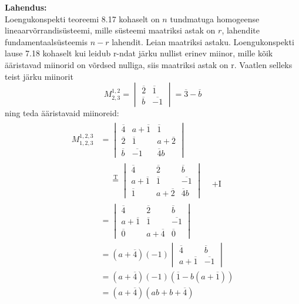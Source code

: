 \documentclass{article}
\newcommand\q[1]{\overline{#1}}
\begin{document}
\textbf{Lahendus:}\\
Loengukonspekti teoreemi 8.17 kohaselt on $n$ tundmatuga homogeense lineaarvõrrandisüsteemi, mille süsteemi maatriksi astak on $r$, lahendite fundamentaalsüsteemis $n-r$ lahendit.
Leian maatriksi astaku.
Loengukonspekti lause 7.18 kohaselt kui leidub r-ndat järku nullist erinev miinor, mille kõik ääristavad miinorid on võrdsed nulliga, siis maatriksi astak on r. Vaatlen selleks teist järku miinorit $$M_{2,3}^{1,2}=\begin{vmatrix}\q{2} & \q{1}\\\q{b} & \q{-1}\end{vmatrix}=\q{3}-\q{b}$$ ning teda ääristavaid miinoreid: 
\begin{gather*}
\begin{aligned}
M_{1,2,3}^{1,2,3}&=\begin{vmatrix}\q{4} &a+\q{1} & \q{1}\\\q{2} & \q{1} & a+\q{2}\\\q{b} & \q{-1} & \q{4}b\end{vmatrix}\\
&\begin{aligned}
&\stackrel{\text{T}}{=}\begin{vmatrix}\q{4} &\q{2} & \q{b}\\a+\q{1} & \q{1} & \q{-1}\\\q{1} & a+\q{2} & \q{4}b\end{vmatrix}
 & \begin{matrix}\\\\+\text{I} \end{matrix}\end{aligned}\\
&=\begin{vmatrix}\q{4} &\q{2} & \q{b}\\a+\q{1} & \q{1} & \q{-1}\\\q{0} & a+\q{4} & \q{0}\end{vmatrix}\\
&=(a+\q{4})(-1)\begin{vmatrix}\q{4} & \q{b}\\a+\q{1} & \q{-1}\end{vmatrix}\\
&=(a+\q{4})(-1)(\q{1}-b(a+\q{1}))\\
&=(a+\q{4})(ab+b+\q{4})
\end{aligned}
\end{gather*}
\end{document}
